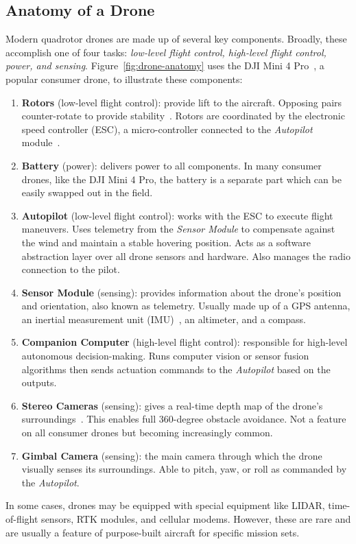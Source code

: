 \subsection{Anatomy of a Drone}
Modern quadrotor drones are made up of several key components. Broadly, these accomplish one of four tasks: \textit{low-level flight control, high-level flight control, power, and sensing}. Figure~\ref{fig:drone-anatomy} uses the DJI Mini 4 Pro~\cite{DJIMini4}, a popular consumer drone, to illustrate these components:

\begin{enumerate}
    \item \textbf{Rotors} (low-level flight control): provide lift to the aircraft. Opposing pairs counter-rotate to provide stability~\cite{Allain2017}. Rotors are coordinated by the electronic speed controller (ESC), a micro-controller connected to the \textit{Autopilot} module~\cite{Nagel2023}.
    \item \textbf{Battery} (power): delivers power to all components. In many consumer drones, like the DJI Mini 4 Pro, the battery is a separate part which can be easily swapped out in the field.
    \item \textbf{Autopilot} (low-level flight control): works with the ESC to execute flight maneuvers. Uses telemetry from the \textit{Sensor Module} to compensate against the wind and maintain a stable hovering position. Acts as a software abstraction layer over all drone sensors and hardware. Also manages the radio connection to the pilot.
    \item \textbf{Sensor Module} (sensing): provides information about the drone's position and orientation, also known as telemetry. Usually made up of a GPS antenna, an inertial measurement unit (IMU)~\cite{IMU}, an altimeter, and a compass.
    \item \textbf{Companion Computer} (high-level flight control): responsible for high-level autonomous decision-making. Runs computer vision or sensor fusion algorithms then sends actuation commands to the \textit{Autopilot} based on the outputs.
    \item \textbf{Stereo Cameras} (sensing): gives a real-time depth map of the drone's surroundings~\cite{Stereo}. This enables full 360-degree obstacle avoidance. Not a feature on all consumer drones but becoming increasingly common.
    \item \textbf{Gimbal Camera} (sensing): the main camera through which the drone visually senses its surroundings. Able to pitch, yaw, or roll as commanded by the \textit{Autopilot}.
\end{enumerate}
In some cases, drones may be equipped with special equipment like LIDAR, time-of-flight sensors, RTK modules, and cellular modems. However, these are rare and are usually a feature of purpose-built aircraft for specific mission sets. 

